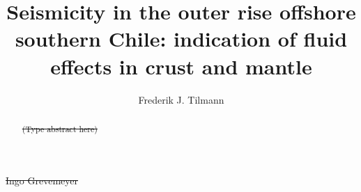 \documentclass[reviewcopy]{elsart}
\providecommand{\DIFadd}[1]{{\protect\color{blue}\uwave{#1}}} %
\providecommand{\DIFdel}[1]{{\protect\color{red}\sout{#1}}}                      %
\providecommand{\DIFaddbegin}{} %
\providecommand{\DIFaddend}{} %
\providecommand{\DIFdelbegin}{} %
\providecommand{\DIFdelend}{} %
\begin{document}
\begin{frontmatter}



\title{Seismicity in the outer rise offshore southern Chile:
  indication of fluid effects in crust and mantle}


\author[cam]{Frederik J. Tilmann}
\DIFdelbegin %
\DIFdel{Ingo Grevemeyer}\DIFdelend \DIFaddbegin \author[ifm,ham]{\DIFadd{et al}\DIFaddend }
\DIFdelbegin %
\DIFdelend %

\address[cam]{Bullard Laboratories, University of Cambridge,
  Cambridge CB3 0EZ, UK}
\address[ifm]{IfM-GEOMAR, Kiel, Germany}
\address[ham]{Institute for Geophysics, University of Hamburg, Hamburg, Germany}

\begin{abstract}
\DIFdelbegin %
\DIFdel{(Type abstract here)}\DIFdelend %
\DIFaddbegin 



\end{abstract}
\end{frontmatter}
\end{document}
